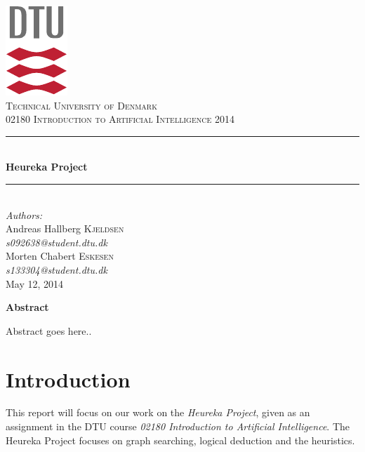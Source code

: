 \documentclass[11pt]{article}
\newcommand{\HRule}{\rule{\linewidth}{0.5mm}}
\begin{document}
\begin{titlepage}
\begin{center}

\includegraphics[scale=2.0]{GFX/dtu_logo.pdf}\\[1cm]

\textsc{\LARGE Technical University of Denmark}\\[1cm]

\textsc{\Large 02180 Introduction to Artificial Intelligence 2014}\\[0.5cm]


\HRule \\[0.4cm]
{\huge \bfseries Heureka Project}\\[0.1cm]
\HRule \\[1cm]

\large
\emph{Authors:}
\\[10pt]
Andreas Hallberg \textsc{Kjeldsen}\\
\emph{s092638@student.dtu.dk}
\\[10pt]
Morten Chabert \textsc{Eskesen}\\
\emph{s133304@student.dtu.dk}\\[1cm]

{\large May 12, 2014}\\[1.5cm]
\end{center}

\begin{center}
	\textbf{Abstract}
\end{center}
Abstract goes here..



\end{titlepage}

\section{Introduction}
\label{sec:intro}
This report will focus on our work on the \emph{Heureka Project}, given as an assignment in the DTU course \emph{02180 Introduction to Artificial Intelligence}. The Heureka Project focuses on graph searching, logical deduction and the heuristics.
\end{document}

